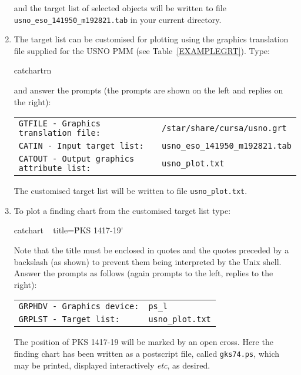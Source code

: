 \documentclass[twoside,11pt]{starlink}
\begin{document}
\begin{enumerate}
   and the target list of selected objects will be written to file
   \texttt{usno\_eso\_141950\_m192821.tab} in your current directory.

  \item The target list can be customised for plotting using the graphics
   translation file supplied for the USNO PMM (see Table~\ref{EXAMPLEGRT}).
   Type:

  \begin{terminalv}
catchartrn
  \end{terminalv}

   and answer the prompts (the prompts are shown on the left and replies
   on the right):

  \begin{tabular}{ll}
   \texttt{GTFILE - Graphics translation file:}      & \texttt{/star/share/cursa/usno.grt} \\
   \texttt{CATIN - Input target list:}               & \texttt{usno\_eso\_141950\_m192821.tab} \\
   \texttt{CATOUT - Output graphics attribute list:} & \texttt{usno\_plot.txt} \\
  \end{tabular}

   The customised target list will be written to file \texttt{usno\_plot.txt}.

  \item To plot a finding chart from the customised target list type:

  \begin{terminalv}
catchart ~ title=\'PKS 1417-19\'
  \end{terminalv}

   Note that the title must be enclosed in quotes and the quotes preceded
   by a backslash (as shown) to prevent them being interpreted by the
   Unix shell.  Answer the prompts as follows (again prompts to the left,
   replies to the right):

  \begin{tabular}{ll}
   \texttt{GRPHDV - Graphics device:} & \texttt{ps\_l}          \\
   \texttt{GRPLST - Target list:}     & \texttt{usno\_plot.txt} \\
  \end{tabular}

   The position of PKS 1417-19 will be marked by an open cross.  Here
   the finding chart has been written as a postscript file, called \texttt{gks74.ps}, which may be printed, displayed interactively \emph{etc},
   as desired.

\end{enumerate}
\end{document}
